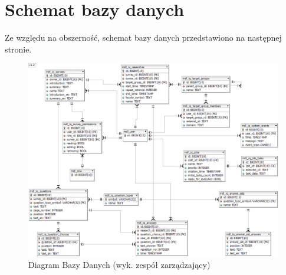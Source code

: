 \section{Schemat bazy danych}
\label{Chapter56}

Ze względu na obszerność, schemat bazy danych przedstawiono na następnej stronie.

\newpage
\begin{landscape}
\begin{figure}[th]
\centering\includegraphics[height=\textheight, width=1.5\textwidth]{figures/iQuest_Database}
\caption{Diagram Bazy Danych (wyk. zespół zarządzający)}\label{rys:iQuest_DataBase}
\end{figure}
\end{landscape}